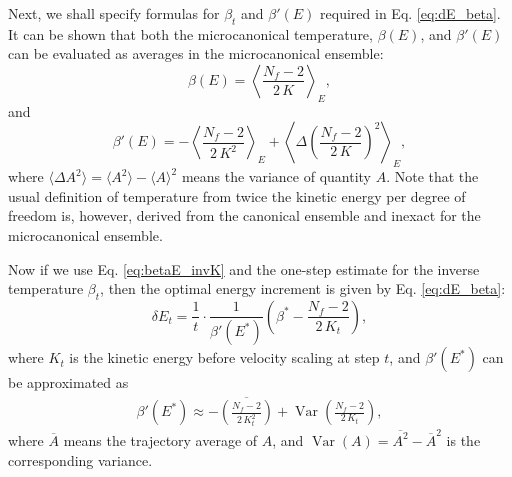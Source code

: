 \documentclass[reprint]{revtex4-1}
\begin{document}
Next, we shall specify formulas for $\beta_t$
and $\beta'(E)$ required in Eq. \eqref{eq:dE_beta}.
%
It can be shown that both the microcanonical temperature, $\beta(E)$,
and $\beta'(E)$ can be evaluated as
averages in the microcanonical ensemble\cite{rugh1997}:
%
\begin{equation}
  \beta(E)
  =
  \left\langle
    \frac{ N_f - 2 }
         { 2 \, K }
  \right\rangle_E
  ,
  \label{eq:betaE_invK}
\end{equation}
%
and
%
\begin{equation}
  \beta'(E)
  =
  - \left\langle
      \frac{ N_f - 2 }
           { 2 \, K^2 }
    \right\rangle_E
  + \left\langle
      \Delta\left(
        \frac{ N_f - 2 }
             { 2 \, K }
      \right)^2
    \right\rangle_E
  ,
  \label{eq:dbetadE}
\end{equation}
%
where
$\langle \Delta A^2 \rangle = \langle A^2 \rangle - \langle A \rangle^2$
means the variance of quantity $A$.
%
Note that the usual definition of temperature from twice the kinetic energy
per degree of freedom is, however,
derived from the canonical ensemble and
inexact for the microcanonical ensemble.



Now if we use Eq. \eqref{eq:betaE_invK} and
the one-step estimate for the inverse temperature
$\beta_t$,
then the optimal energy increment is given by
Eq. \eqref{eq:dE_beta}:
\begin{equation}
\delta E_t
=
\frac{ 1 } { t } \cdot
\frac{ 1 } { \beta'(E^*) }
\left(
 \beta^* -
 \frac{ N_f - 2 }
 { 2 \, K_t }
\right)
,
\label{eq:dE_final}
\end{equation}
where
$K_t$ is the kinetic energy before velocity scaling at step $t$,
and $\beta'(E^*)$ can be approximated
as
%
\begin{align}
  \beta'(E^*)
  \approx
  - \overline{
    \left(
      \frac{ N_f - 2 }
           { 2 \, K_t^2 }
    \right)
    }
    +
    \operatorname{Var}
    \left(
        \frac{ N_f - 2 }
             { 2 \, K_t }
    \right)
  ,
  \label{eq:dbeta}
\end{align}
%
where
$\overline A$ means the trajectory average of $A$,
and
$\operatorname{Var}(A) = \overline{ A^2 } - {\overline A}^2$
is the corresponding variance.


\end{document}
